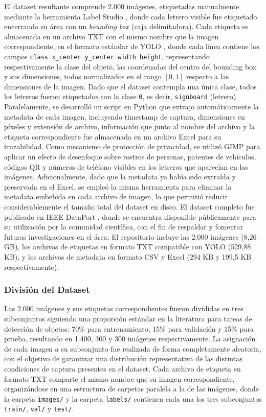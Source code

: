 \documentclass[runningheads]{llncs}
\begin{document}
El dataset resultante comprende 2.000 imágenes, etiquetadas manualmente 
mediante la herramienta Label Studio \cite{labelstudio2026}, donde cada 
letrero visible fue etiquetado encerrando su área con un \textit{bounding 
box} (caja delimitadora). Cada etiqueta es almacenada en un archivo TXT 
con el mismo nombre que la imagen correspondiente, en el formato estándar 
de YOLO \cite{ultralytics_datasets_detect}, donde cada línea contiene los campos \texttt{class x\_center 
y\_center width height}, representando respectivamente la clase del 
objeto, las coordenadas del centro del bounding box y sus dimensiones, 
todos normalizados en el rango $[0, 1]$ respecto a las dimensiones de 
la imagen. Dado que el dataset contempla una única clase, todos los 
letreros fueron etiquetados con la clase \texttt{0}, es decir, \texttt{signboard} (letrero). 
Paralelamente, se desarrolló un script en Python \cite{python2026} que 
extrajo automáticamente la metadata de cada imagen, incluyendo timestamp 
de captura, dimensiones en píxeles y extensión de archivo, información 
que junto al nombre del archivo y la etiqueta correspondiente fue 
almacenada en un archivo Excel para su trazabilidad. Como mecanismo de 
protección de privacidad, se utilizó GIMP \cite{gimp2026} para aplicar 
un efecto de desenfoque sobre rostros de personas, patentes de vehículos, códigos QR y números de teléfono visibles en los letreros que aparecían en las 
imágenes. Adicionalmente, dado que la metadata ya había sido extraída y 
preservada en el Excel, se empleó la misma herramienta para eliminar la 
metadata embebida en cada archivo de imagen, lo que permitió reducir 
considerablemente el tamaño total del dataset en disco. El dataset 
completo fue publicado en IEEE DataPort \cite{ieee-dataset}, donde se 
encuentra disponible públicamente para su utilización por la comunidad 
científica, con el fin de respaldar y fomentar futuras investigaciones 
en el área. El repositorio incluye las 2.000 imágenes (8,26 GB), los 
archivos de etiquetas en formato TXT compatible con YOLO (529,88 KB), 
y los archivos de metadata en formato CSV y Excel (294 KB y 199,5 KB 
respectivamente).

\subsubsection{División del Dataset}
Las 2.000 imágenes y sus etiquetas correspondientes fueron divididas 
en tres subconjuntos siguiendo una proporción estándar en la literatura 
para tareas de detección de objetos: 70\% para entrenamiento, 15\% para 
validación y 15\% para prueba, resultando en 1.400, 300 y 300 imágenes 
respectivamente. La asignación de cada imagen a su subconjunto fue 
realizada de forma completamente aleatoria, con el objetivo de garantizar 
una distribución representativa de las distintas condiciones de captura 
presentes en el dataset. Cada archivo de etiqueta en formato TXT comparte 
el mismo nombre que su imagen correspondiente, organizándose en una 
estructura de carpetas paralela a la de las imágenes, donde la carpeta 
\texttt{images/} y la carpeta \texttt{labels/} contienen cada una los 
tres subconjuntos \texttt{train/}, \texttt{val/} y \texttt{test/}.
\end{document}
